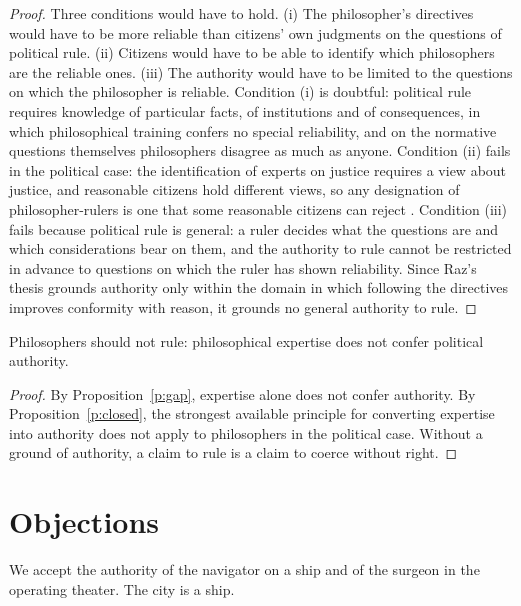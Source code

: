 \documentclass{situationist-preprint}
\begin{document}
\begin{proof}
Three conditions would have to hold. (i) The philosopher's directives would have to be more reliable than citizens' own judgments on the questions of political rule. (ii) Citizens would have to be able to identify which philosophers are the reliable ones. (iii) The authority would have to be limited to the questions on which the philosopher is reliable. Condition (i) is doubtful: political rule requires knowledge of particular facts, of institutions and of consequences, in which philosophical training confers no special reliability, and on the normative questions themselves philosophers disagree as much as anyone. Condition (ii) fails in the political case: the identification of experts on justice requires a view about justice, and reasonable citizens hold different views, so any designation of philosopher-rulers is one that some reasonable citizens can reject \citep{Estlund2008}. Condition (iii) fails because political rule is general: a ruler decides what the questions are and which considerations bear on them, and the authority to rule cannot be restricted in advance to questions on which the ruler has shown reliability. Since Raz's thesis grounds authority only within the domain in which following the directives improves conformity with reason, it grounds no general authority to rule.
\end{proof}

\begin{theorem}\label{t:main}
Philosophers should not rule: philosophical expertise does not confer political authority.
\end{theorem}

\begin{proof}
By Proposition~\ref{p:gap}, expertise alone does not confer authority. By Proposition~\ref{p:closed}, the strongest available principle for converting expertise into authority does not apply to philosophers in the political case. Without a ground of authority, a claim to rule is a claim to coerce without right.
\end{proof}

\section{Objections}

\begin{objection}
We accept the authority of the navigator on a ship and of the surgeon in the operating theater. The city is a ship.
\end{objection}
\end{document}
